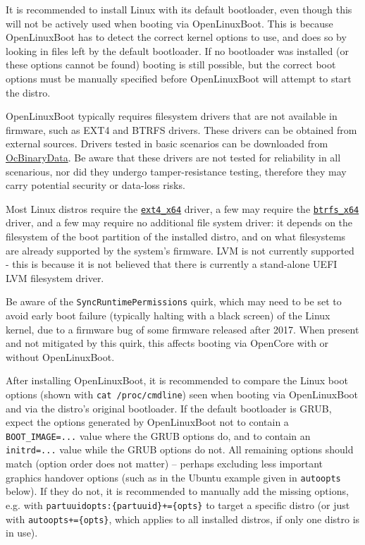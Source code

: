 \documentclass[]{article}
\begin{document}
It is recommended to install Linux with its default bootloader, even though this will not be actively used
when booting via OpenLinuxBoot. This is because OpenLinuxBoot has to detect the correct kernel options to
use, and does so by looking in files left by the default bootloader. If no bootloader was installed (or
these options cannot be found) booting is still possible, but the correct boot options must be manually
specified before OpenLinuxBoot will attempt to start the distro.

OpenLinuxBoot typically requires filesystem drivers that are not available in
firmware, such as EXT4 and BTRFS drivers. These drivers can be obtained from external sources.
Drivers tested in basic scenarios can be downloaded from \href{https://github.com/acidanthera/OcBinaryData}{OcBinaryData}.
Be aware that these drivers are not tested for reliability in all scenarious, nor did they undergo
tamper-resistance testing, therefore they may carry potential security or data-loss risks.

Most Linux distros require the \href{https://github.com/acidanthera/OcBinaryData}{\texttt{ext4\_x64}} driver,
a few may require the \href{https://github.com/acidanthera/OcBinaryData}{\texttt{btrfs\_x64}} driver, and a few
may require no additional file system driver: it depends on the filesystem of the boot partition of the installed
distro, and on what filesystems are already supported by the system's firmware. LVM is not currently
supported - this is because it is not believed that there is currently a stand-alone UEFI LVM filesystem driver.

Be aware of the \texttt{SyncRuntimePermissions} quirk, which may need to be set to avoid early boot
failure (typically halting with a black screen) of the Linux kernel, due to a firmware bug of some
firmware released after 2017. When present and not mitigated by this quirk, this affects booting
via OpenCore with or without OpenLinuxBoot.

After installing OpenLinuxBoot, it is recommended to compare the Linux boot options (shown with \texttt{cat /proc/cmdline})
seen when booting via OpenLinuxBoot and via the distro's original bootloader. If the default bootloader
is GRUB, expect the options generated by OpenLinuxBoot not to
contain a \texttt{BOOT\_IMAGE=...} value where the GRUB options do, and to contain an
\texttt{initrd=...} value while the GRUB options do not.
All remaining options should match (option order does not matter) -- perhaps excluding less important graphics
handover options (such as in the Ubuntu example given in \texttt{autoopts} below). If they do not, it is recommended
to manually add the missing options, e.g. with \texttt{partuuidopts:\{partuuid\}+=\{opts\}} to target a specific
distro (or just with \texttt{autoopts+=\{opts\}}, which applies to all installed distros, if only one distro is in use).
\end{document}
